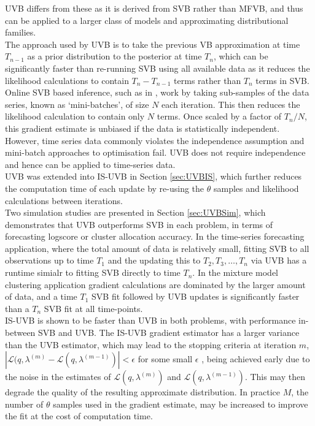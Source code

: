 \documentclass[12pt,a4paper]{article}\usepackage[]{graphicx}\usepackage[]{color}
\begin{document}
UVB differs from these as it is derived from SVB rather than MFVB, and thus can be applied to a larger class of models and approximating distributional families.
\\

The approach used by UVB is to take the previous VB approximation at time $T_{n-1}$ as a prior distribution to the posterior at time $T_{n}$, which can be significantly faster than re-running SVB using all available data as it reduces the likelihood calculations to contain $T_{n} - T_{n-1}$ terms rather than $T_{n}$ terms in SVB. 
\\

Online SVB based inference, such as in \citet{Paisley2012}, work by taking sub-samples of the data series, known as `mini-batches', of size $N$ each iteration. This then reduces the likelihood calculation to contain only $N$ terms. Once scaled by a factor of $T_{n} / N$,  this gradient estimate is unbiased if the data is statistically independent. However, time series data commonly violates the independence assumption and mini-batch approaches to optimisation fail. UVB does not require independence and hence can be applied to time-series data.  
\\

UVB was extended into IS-UVB in Section \ref{sec:UVBIS}, which further reduces the computation time of each update by re-using the $\theta$ samples and likelihood calculations between iterations.
\\

Two simulation studies are presented in Section \ref{sec:UVBSim}, which demonstrates that UVB outperforms SVB in each problem, in terms of forecasting logscore or cluster allocation accuracy. In the time-series forecasting application, where the total amount of data is relatively small, fitting SVB to all observations up to time $T_1$ and the updating this to $T_2, T_3, \ldots, T_n$ via UVB has a runtime simialr to fitting SVB directly to time $T_n$. In the mixture model clustering application gradient calculations are dominated by the larger amount of data, and a time $T_1$ SVB fit followed by UVB updates is significantly faster than a $T_n$ SVB fit at all time-points.
\\

IS-UVB is shown to be faster than UVB in both problems, with performance in-between SVB and UVB. The IS-UVB gradient estimator has a larger variance than the UVB estimator, which may lead to the stopping criteria at iteration $m$, $|\mathcal{L}(q, \lambda^{(m)} - \mathcal{L}(q, \lambda^{(m-1)})| < \epsilon$ for some small $\epsilon$ , being achieved early due to the noise in the estimates of $\mathcal{L}(q, \lambda^{(m)})$ and $\mathcal{L}(q, \lambda^{(m-1)})$. This may then degrade the quality of the resulting approximate distribution. In practice $M$, the number of $\theta$ samples used in the gradient estimate, may be increased to improve the fit at the cost of computation time.
\\
\end{document}
